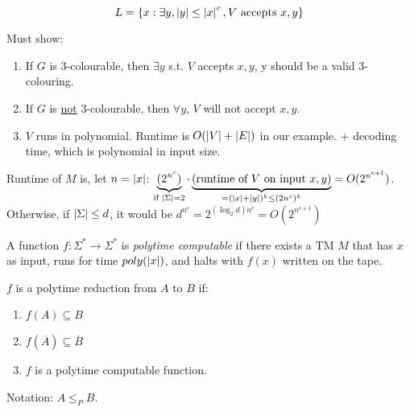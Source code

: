 \begin{equation*}
    L = \left \{ x : \exists y, |y| \leq \left | x \right |^c, V \text{ accepts } x, y \right \}
\end{equation*}

Must show:

\begin{enumerate}
    \item If $G$ is 3-colourable, then $\exists y$ s.t. $V$ accepts $x, y$, y should be a valid 3-colouring.
    \item If $G$ is \underline{not} 3-colourable, then $\forall y$, $V$ will not accept $x, y$.
    \item $V$ runs in polynomial. Runtime is $O(\left | V \right | + \left | E \right |)$ in our example. + decoding time, which is polynomial in input size.
\end{enumerate}

Runtime of $M$ is, let $n = \left | x \right |$: $\underbrace{(2^{n^c})}_{\text{if } \left | \Sigma \right | = 2} \cdot \underbrace{(\text{runtime of } V \text{ on input } x, y)}_{= (\left | x \right | + \left | y \right |)^k \leq (2n^c)^k} = O(2^{n^{c+1}})$. Otherwise, if $\left | \Sigma \right | \leq d$, it would be $d^{n^c} = 2^{(\log_2{d})n^c} = O(2^{n^{c+1}})$

\begin{definition}
    A function $f : \Sigma^* \rightarrow \Sigma^*$ is \emph{polytime computable} if there exists a \textsf{TM} $M$ that has $x$ as input, runs for time $poly(\left | x \right |)$, and halts with $f(x)$ written on the tape.
\end{definition}

\begin{definition}
    $f$ is a polytime reduction from $A$ to $B$ if:

    \begin{enumerate}
        \item $f(A) \subseteq B$
        \item $f(\overline{A}) \subseteq \overline{B}$
        \item $f$ is a polytime computable function.
    \end{enumerate}
\end{definition}

Notation: $A \leq_{P} B$.

